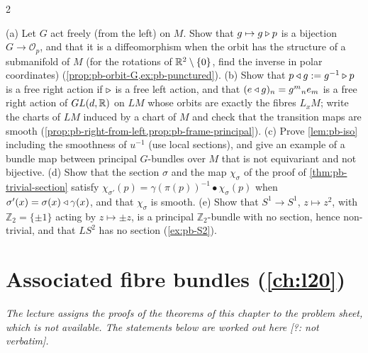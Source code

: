 \begin{paracol}{2}
\begin{exercise}\label{ex:pb-full}
(a) Let $G$ act freely (from the left) on $M$. Show that $g\mapsto g\mathbin{\triangleright} p$ is a bijection $G\to\mathcal O_p$, and that it is a diffeomorphism when the orbit has the structure of a submanifold of $M$ (for the rotations of $\mathbb{R}^2\setminus\{0\}$, find the inverse in polar coordinates) (\cref{prop:pb-orbit-G,ex:pb-punctured}). (b) Show that $p\mathbin{\triangleleft} g:=g^{-1}\mathbin{\triangleright} p$ is a free right action if $\mathbin{\triangleright}$ is a free left action, and that $(e\mathbin{\triangleleft} g)_n=g^m{}_ne_m$ is a free right action of $GL(d,\mathbb{R})$ on $LM$ whose orbits are exactly the fibres $L_xM$; write the charts of $LM$ induced by a chart of $M$ and check that the transition maps are smooth (\cref{prop:pb-right-from-left,prop:pb-frame-principal}). (c) Prove \cref{lem:pb-iso} including the smoothness of $u^{-1}$ (use local sections), and give an example of a bundle map between principal $G$-bundles over $M$ that is not equivariant and not bijective. (d) Show that the section $\sigma$ and the map $\chi_\sigma$ of the proof of \cref{thm:pb-trivial-section} satisfy $\chi_{\sigma'}(p)=\gamma(\pi(p))^{-1}\bullet\chi_\sigma(p)$ when $\sigma'(x)=\sigma(x)\mathbin{\triangleleft}\gamma(x)$, and that $\chi_\sigma$ is smooth. (e) Show that $S^1\to S^1$, $z\mapsto z^2$, with $\mathbb Z_2=\{\pm1\}$ acting by $z\mapsto\pm z$, is a principal $\mathbb Z_2$-bundle with no section, hence non-trivial, and that $LS^2$ has no section (\cref{ex:pb-S2}).
\end{exercise}

\section{Associated fibre bundles (\cref{ch:l20})}\label{exam:ch20}

\emph{The lecture assigns the proofs of the theorems of this chapter to the problem sheet, which is not available. The statements below are worked out here [?: not verbatim].}


\end{paracol}
